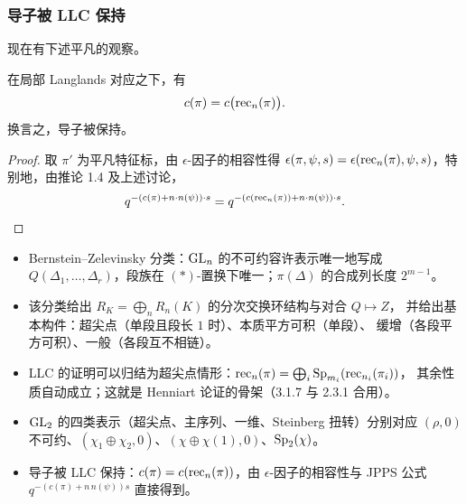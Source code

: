 \subsubsection{导子被 LLC 保持}

现在有下述平凡的观察。

\begin{lemma}
在局部 Langlands 对应之下，有
\[
c(\pi)=c\bigl(\mathrm{rec}_n(\pi)\bigr).
\]
换言之，导子被保持。
\end{lemma}

\begin{proof}
取 $\pi'$ 为平凡特征标，由 $\epsilon$-因子的相容性得
$\epsilon(\pi,\psi,s)=\epsilon(\mathrm{rec}_n(\pi),\psi,s)$，特别地，由推论 1.4 及上述讨论，
\[
q^{-\left(c(\pi)+n\cdot n(\psi)\right)\cdot s}
=q^{-\left(c(\mathrm{rec}_n(\pi))+n\cdot n(\psi)\right)\cdot s}.
\]
\end{proof}

\begin{keytakeaways}
\begin{itemize}[leftmargin=1.5em]
\item Bernstein--Zelevinsky 分类：$\mathrm{GL}_n$ 的不可约容许表示唯一地写成
      $Q(\Delta_1,\dots,\Delta_r)$，段族在 $(*)$-置换下唯一；$\pi(\Delta)$ 的合成列长度 $2^{m-1}$。
\item 该分类给出 $R_K=\bigoplus_n R_n(K)$ 的分次交换环结构与对合 $Q\mapsto Z$，
      并给出基本构件：超尖点（单段且段长 $1$ 时）、本质平方可积（单段）、
      缓增（各段平方可积）、一般（各段互不相链）。
\item LLC 的证明可以归结为超尖点情形：$\mathrm{rec}_n(\pi)=\bigoplus_i\mathrm{Sp}_{m_i}(\mathrm{rec}_{n_i}(\pi_i))$，
      其余性质自动成立；这就是 Henniart 论证的骨架（3.1.7 与 2.3.1 合用）。
\item $\mathrm{GL}_2$ 的四类表示（超尖点、主序列、一维、Steinberg 扭转）分别对应
      $(\rho,0)$ 不可约、$(\chi_1\oplus\chi_2,0)$、$(\chi\oplus\chi(1),0)$、$\mathrm{Sp}_2(\chi)$。
\item 导子被 LLC 保持：$c(\pi)=c(\mathrm{rec}_n(\pi))$，由 $\epsilon$-因子的相容性与
      JPPS 公式 $q^{-(c(\pi)+n\,n(\psi))s}$ 直接得到。
\end{itemize}
\end{keytakeaways}
